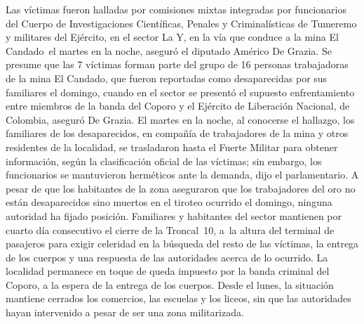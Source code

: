 \documentclass{article}%
\begin{document}
\newline%
%
Las víctimas fueron halladas por comisiones mixtas integradas por funcionarios del Cuerpo de Investigaciones Científicas, Penales y Criminalísticas de Tumeremo y militares del Ejército, en el sector La Y, en la vía que conduce a la mina El Candado~el martes en la noche, aseguró el diputado Américo De Grazia.%
\newline%
%
Se presume que las 7 víctimas forman parte del grupo de 16 personas trabajadoras de la mina El Candado, que fueron reportadas como desaparecidas por sus familiares el domingo, cuando en el sector se presentó el supuesto enfrentamiento entre miembros de la banda del Coporo y el Ejército de Liberación Nacional, de Colombia, aseguró De Grazia.%
\newline%
%
El martes en la noche, al conocerse el hallazgo, los familiares de los desaparecidos, en compañía de trabajadores de la mina y otros residentes de la localidad, se trasladaron hasta el Fuerte Militar para obtener información, según la clasificación oficial de las víctimas; sin embargo, los funcionarios se mantuvieron herméticos ante la demanda, dijo el parlamentario.%
\newline%
%
A pesar de que los habitantes de la zona aseguraron que los trabajadores del oro no están desaparecidos sino muertos en el tiroteo ocurrido el domingo, ninguna autoridad ha fijado posición. Familiares y habitantes del sector mantienen por cuarto día consecutivo el cierre de la Troncal~10, a~la altura del terminal de pasajeros para exigir celeridad en la búsqueda del resto de las víctimas, la entrega de los cuerpos y una respuesta de las autoridades acerca de lo ocurrido.%
\newline%
%
La localidad permanece en toque de queda impuesto por la banda criminal del Coporo, a la espera de la entrega de los cuerpos. Desde el lunes, la situación mantiene cerrados los comercios, las escuelas y los liceos, sin que las autoridades hayan intervenido a pesar de ser una zona militarizada.%
\newline%
%
\end{document}
